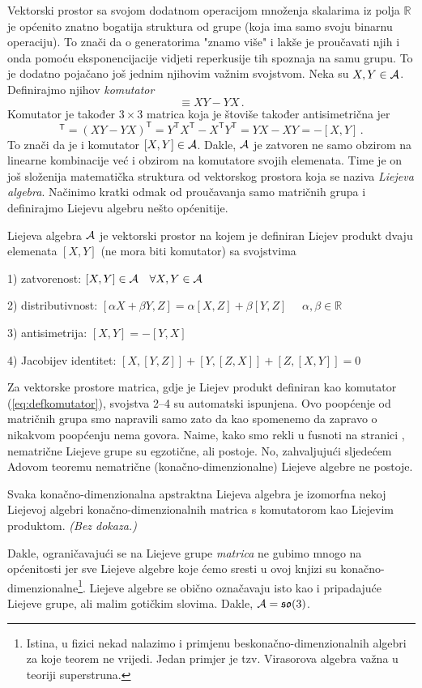 Vektorski prostor sa svojom dodatnom operacijom množenja
skalarima iz polja $\mathbb{R}$ je općenito znatno bogatija struktura od grupe (koja
ima samo svoju binarnu operaciju). To znači da o generatorima "znamo više" i
lakše je proučavati njih i onda pomoću eksponencijacije vidjeti reperkusije tih
spoznaja na samu grupu.
To je dodatno pojačano još jednim njihovim važnim svojstvom.
Neka su $X,Y\in\mathcal{A}$. Definirajmo njihov \emph{komutator} 
\begin{equation}
    [X, Y] \equiv X Y - Y X \,.
    \label{eq:defkomutator}
\end{equation}
Komutator je također $3\times 3$ matrica koja je štoviše također antisimetrična
jer
\begin{equation}
 [X,Y]^\mathsf{T} = (XY-YX)^\mathsf{T} = Y^\mathsf{T} X^\mathsf{T} - X^\mathsf{T} Y^\mathsf{T}
 = YX-XY = -[X,Y] \,.
\end{equation}
To znači da je i komutator $[X,Y]\in\mathcal{A}$.
Dakle, $\mathcal{A}$ je zatvoren ne samo obzirom na linearne kombinacije već
i obzirom na komutatore svojih elemenata. Time je on još složenija matematička
struktura od vektorskog prostora koja se naziva  \emph{Liejeva algebra}.
Načinimo kratki odmak od proučavanja samo matričnih grupa i
definirajmo Liejevu algebru nešto općenitije.
\begin{definicija}
Liejeva algebra $\mathcal{A}$ je vektorski prostor na kojem je definiran 
Liejev produkt dvaju elemenata $[X,Y]$ (ne mora biti komutator) sa svojstvima

1) zatvorenost: $[X,Y]\in\mathcal{A} \quad \forall X,Y\in\mathcal{A}$

2) distributivnost: $[\alpha X + \beta Y, Z]=\alpha[X,Z]+\beta[Y,Z]$
$\quad \alpha,\beta \in \mathbb{R} $

3) antisimetrija: $[X,Y]=-[Y,X]$

4) Jacobijev identitet: $[X, [Y, Z]]+[Y, [Z, X]]+[Z, [X, Y]]=0$
\end{definicija}
Za vektorske prostore matrica, gdje je Liejev produkt definiran kao
komutator (\ref{eq:defkomutator}), svojstva 2--4 su automatski ispunjena.
Ovo poopćenje od matričnih grupa smo napravili samo zato da kao
spomenemo da zapravo o nikakvom poopćenju nema govora.
Naime, kako smo rekli u fusnoti na stranici \pageref{fus:nematricne}, nematrične Liejeve grupe
su egzotične, ali postoje. No, zahvaljujući sljedećem Adovom teoremu
nematrične (konačno-dimenzionalne) Liejeve algebre ne postoje.
\begin{teorem}[Ado]
 Svaka konačno-dimenzionalna apstraktna Liejeva algebra je izomorfna nekoj
 Liejevoj algebri konačno-dimenzionalnih matrica s komutatorom kao Liejevim produktom. \emph{(Bez
 dokaza.)}
\end{teorem}
Dakle, ograničavajući se na Liejeve grupe \emph{matrica} ne gubimo mnogo
na općenitosti jer sve Liejeve algebre koje ćemo sresti u ovoj knjizi su
konačno-dimenzionalne\footnote{Istina, u fizici nekad nalazimo i primjenu beskonačno-dimenzionalnih
algebri za koje teorem ne vrijedi. Jedan primjer je tzv. Virasorova algebra važna
u teoriji superstruna.}.
Liejeve algebre se obično označavaju isto kao i pripadajuće Liejeve grupe, ali malim gotičkim slovima.
Dakle, $\mathcal{A} = \mathfrak{so}(3)$.

